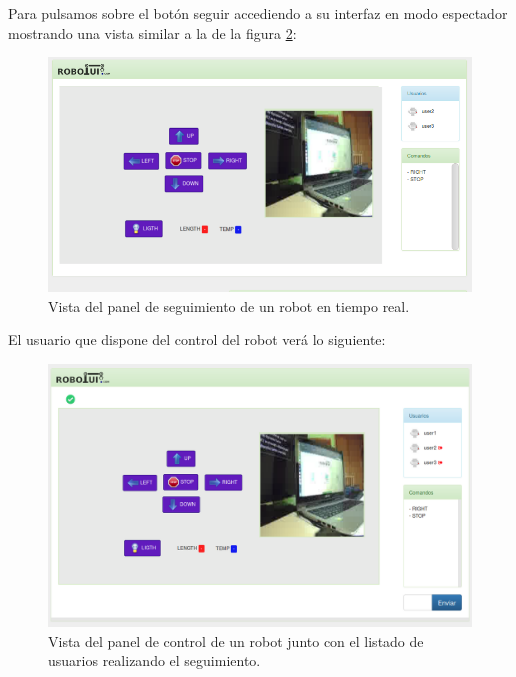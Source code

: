 Para pulsamos sobre el botón seguir accediendo a su interfaz en modo espectador mostrando una vista similar a la de la figura \ref{website:ventana-seguimiento}:\\

\begin{figure}[H]
  \begin{center}
    \includegraphics[scale=.6]{imagenes/manual-usuario/vista_seguimiento.png}
  \end{center}
  \caption{ Vista del panel de seguimiento de un robot en tiempo real.}
  \label{website:ventana-seguimiento}
\end{figure}


El usuario que dispone del control del robot verá lo siguiente:


\begin{figure}[H]
  \begin{center}
    \includegraphics[scale=.4]{imagenes/manual-usuario/vista_control.png}
  \end{center}
  \caption{ Vista del panel de control de un robot junto con el listado de usuarios realizando el seguimiento.}
  \label{website:ventana-seguimiento}
\end{figure}



